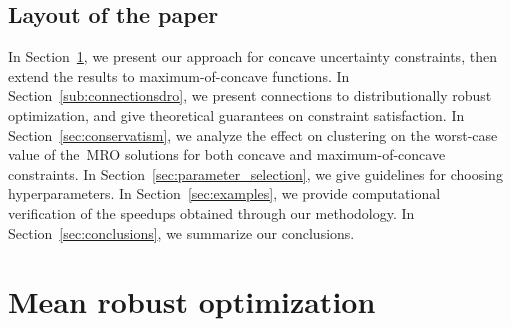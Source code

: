\documentclass[12pt]{article}
\theoremstyle{thmstyleone}%
\theoremstyle{thmstyletwo}%
\theoremstyle{thmstylethree}%
\newcommand{\reviewChanges}{}
\begin{document}

\subsection{Layout of the paper}%
\reviewChanges{
In Section~\ref{sec:mro}, we present our approach for concave uncertainty constraints, then extend the results to maximum-of-concave functions. 
In Section~\ref{sub:connectionsdro}, we present connections to distributionally robust optimization, and give theoretical guarantees on constraint satisfaction.
In Section~\ref{sec:conservatism}, we analyze the effect on clustering on the worst-case value of the~\gls{MRO} solutions for both concave and maximum-of-concave constraints}.
In Section~\ref{sec:parameter_selection}, we give guidelines for choosing hyperparameters.
In Section~\ref{sec:examples}, we provide computational verification of the speedups obtained through our methodology.
In Section~\ref{sec:conclusions}, we summarize our conclusions.

\section{Mean robust optimization}%
\label{sec:mro}
\end{document}
